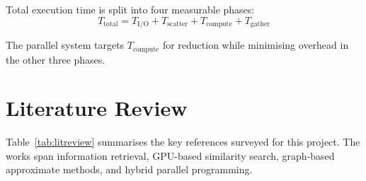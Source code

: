 \documentclass[12pt,a4paper]{article}
\begin{document}
Total execution time is split into four measurable phases:
\begin{equation}
    T_{\text{total}} = T_{\text{I/O}} + T_{\text{scatter}} +
    T_{\text{compute}} + T_{\text{gather}}
\end{equation}

The parallel system targets $T_{\text{compute}}$ for reduction while
minimising overhead in the other three phases.

\clearpage
\section{Literature Review}

Table~\ref{tab:litreview} summarises the key references surveyed for
this project. The works span information retrieval, GPU-based similarity
search, graph-based approximate methods, and hybrid parallel programming.
\end{document}
